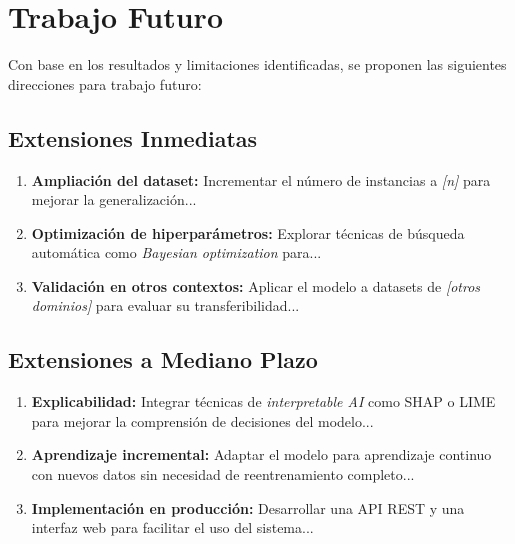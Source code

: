 \section{Trabajo Futuro}
\label{sec:trabajo_futuro}

Con base en los resultados y limitaciones identificadas, se proponen las siguientes direcciones para trabajo futuro:

\subsection{Extensiones Inmediatas}

\begin{enumerate}
    \item \textbf{Ampliación del dataset:} Incrementar el número de instancias a \textit{[n]} para mejorar la generalización...
    
    \item \textbf{Optimización de hiperparámetros:} Explorar técnicas de búsqueda automática como \textit{Bayesian optimization} para...
    
    \item \textbf{Validación en otros contextos:} Aplicar el modelo a datasets de \textit{[otros dominios]} para evaluar su transferibilidad...
\end{enumerate}

\subsection{Extensiones a Mediano Plazo}

\begin{enumerate}
    \item \textbf{Explicabilidad:} Integrar técnicas de \textit{interpretable AI} como SHAP o LIME para mejorar la comprensión de decisiones del modelo...
    
    \item \textbf{Aprendizaje incremental:} Adaptar el modelo para aprendizaje continuo con nuevos datos sin necesidad de reentrenamiento completo...
    
    \item \textbf{Implementación en producción:} Desarrollar una API REST y una interfaz web para facilitar el uso del sistema...
\end{enumerate}

